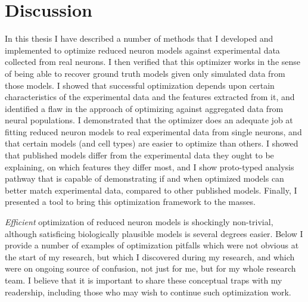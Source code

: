 \chapter{Discussion}
In this thesis I have described a number of methods that I developed and implemented to optimize reduced neuron models against experimental data collected from real neurons.
I then verified that this optimizer works in the sense of being able to recover ground truth models given only simulated data from those models.
I showed that successful optimization depends upon certain characteristics of the experimental data and the features extracted from it, and identified a flaw in the approach of optimizing against aggregated data from neural populations. 
I demonstrated that the optimizer does an adequate job at fitting reduced neuron models to real experimental data from single neurons, and that certain models (and cell types) are easier to optimize than others.
I showed that published models differ from the experimental data they ought to be explaining, on which features they differ most, and I show proto-typed analysis pathway that is capable of demonstrating if and when optimized models can better match experimental data, compared to other published models.
Finally, I presented a tool to bring this optimization framework to the masses.

\emph{Efficient} optimization of reduced neuron models is shockingly non-trivial, although satisficing biologically plausible models is several degrees easier.
Below I provide a number of examples of optimization pitfalls which were not obvious at the start of my research, but which I discovered during my research, and which were on ongoing source of confusion, not just for me, but for my whole research team.
I believe that it is important to share these conceptual traps with my readership, including those who may wish to continue such optimization work.







